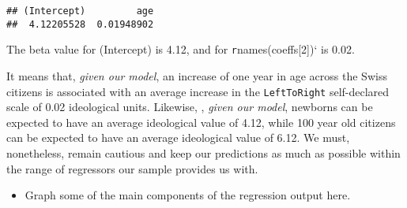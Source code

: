 \documentclass[
]{book}
\providecommand{\tightlist}{%
  \setlength{\itemsep}{0pt}\setlength{\parskip}{0pt}}
\begin{document}
\begin{verbatim}
## (Intercept)         age 
##  4.12205528  0.01948902
\end{verbatim}

The beta value for (Intercept) is 4.12, and for \texttt{r}names(coeffs{[}2{]})` is 0.02.

It means that, \emph{given our model}, an increase of one year in age across the Swiss citizens is associated with an average increase in the \texttt{LeftToRight} self-declared scale of 0.02 ideological units. Likewise, , \emph{given our model}, newborns can be expected to have an average ideological value of 4.12, while 100 year old citizens can be expected to have an average ideological value of 6.12. We must, nonetheless, remain cautious and keep our predictions as much as possible within the range of regressors our sample provides us with.

\begin{itemize}
\tightlist
\item
  Graph some of the main components of the regression output here.
\end{itemize}
\end{document}
